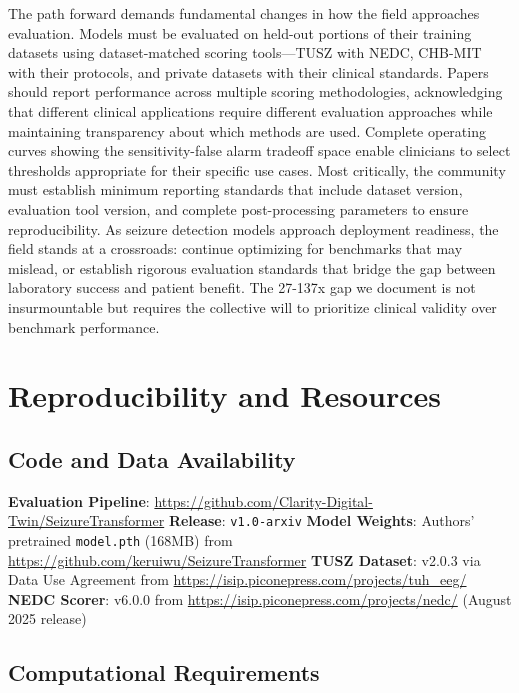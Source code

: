 \documentclass[
]{article}
\begin{document}
The path forward demands fundamental changes in how the field approaches
evaluation. Models must be evaluated on held-out portions of their
training datasets using dataset-matched scoring tools---TUSZ with NEDC,
CHB-MIT with their protocols, and private datasets with their clinical
standards. Papers should report performance across multiple scoring
methodologies, acknowledging that different clinical applications
require different evaluation approaches while maintaining transparency
about which methods are used. Complete operating curves showing the
sensitivity-false alarm tradeoff space enable clinicians to select
thresholds appropriate for their specific use cases. Most critically,
the community must establish minimum reporting standards that include
dataset version, evaluation tool version, and complete post-processing
parameters to ensure reproducibility. As seizure detection models
approach deployment readiness, the field stands at a crossroads:
continue optimizing for benchmarks that may mislead, or establish
rigorous evaluation standards that bridge the gap between laboratory
success and patient benefit. The 27-137x gap we document is not
insurmountable but requires the collective will to prioritize clinical
validity over benchmark performance.

\hypertarget{reproducibility-and-resources}{%
\section{Reproducibility and
Resources}\label{reproducibility-and-resources}}

\hypertarget{code-and-data-availability}{%
\subsection{Code and Data
Availability}\label{code-and-data-availability}}

\textbf{Evaluation Pipeline}:
\url{https://github.com/Clarity-Digital-Twin/SeizureTransformer}
\textbf{Release}: \texttt{v1.0-arxiv} \textbf{Model Weights}: Authors'
pretrained \texttt{model.pth} (168MB) from
\url{https://github.com/keruiwu/SeizureTransformer} \textbf{TUSZ
Dataset}: v2.0.3 via Data Use Agreement from
\url{https://isip.piconepress.com/projects/tuh_eeg/} \textbf{NEDC
Scorer}: v6.0.0 from \url{https://isip.piconepress.com/projects/nedc/}
(August 2025 release)

\hypertarget{computational-requirements}{%
\subsection{Computational
Requirements}\label{computational-requirements}}
\end{document}
